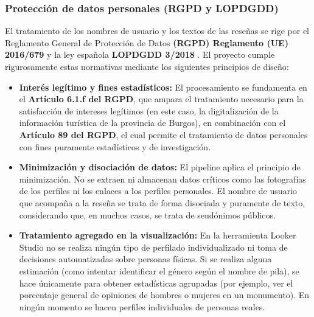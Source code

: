 \subsubsection{Protección de datos personales (RGPD y LOPDGDD)}
El tratamiento de los nombres de usuario y los textos de las reseñas se rige por el Reglamento General de Protección de Datos \textbf{(RGPD) Reglamento (UE) 2016/679} \cite{rgpd_2016} y la ley española \textbf{LOPDGDD 3/2018} \cite{lopdgdd_2018}. El proyecto cumple rigurosamente estas normativas mediante los siguientes principios de diseño:
\begin{itemize}
    \item \textbf{Interés legítimo y fines estadísticos:} El procesamiento se fundamenta en el \textbf{Artículo 6.1.f del RGPD}, que ampara el tratamiento necesario para la satisfacción de intereses legítimos (en este caso, la digitalización de la información turística de la provincia de Burgos), en combinación con el \textbf{Artículo 89 del RGPD}, el cual permite el tratamiento de datos personales con fines puramente estadísticos y de investigación.
    \item \textbf{Minimización y disociación de datos:} El pipeline aplica el principio de minimización. No se extraen ni almacenan datos críticos como las fotografías de los perfiles ni los enlaces a los perfiles personales. El nombre de usuario que acompaña a la reseña se trata de forma disociada y puramente de texto, considerando que, en muchos casos, se trata de seudónimos públicos.
    \item \textbf{Tratamiento agregado en la visualización:} En la herramienta Looker Studio no se realiza ningún tipo de perfilado individualizado ni toma de decisiones automatizadas sobre personas físicas. Si se realiza alguna estimación (como intentar identificar el género según el nombre de pila), se hace únicamente para obtener estadísticas agrupadas (por ejemplo, ver el porcentaje general de opiniones de hombres o mujeres en un monumento). En ningún momento se hacen perfiles individuales de personas reales.
\end{itemize}

